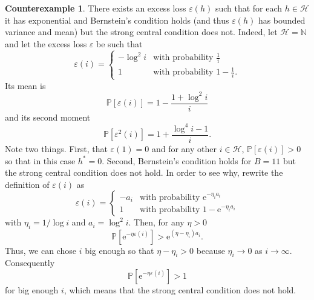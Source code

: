 \documentclass{uvamath}
\newcommand*{\nats}{\mathbb{N}}
\newcommand*{\calH}{\mathcal{H}}
\newcommand*{\bbP}{\mathbb{P}}
\newcommand*{\rme}{\mathrm{e}}
\theoremstyle{remark}
\theoremstyle{definition}
\newtheorem{counterexample}[theorem]{Counterexample}
\theoremstyle{definition}
\theoremstyle{definition}
\theoremstyle{definition}
\theoremstyle{definition}
\begin{document}
\begin{counterexample}\label{ctrex:bernstein_but_not_central}
  There exists an excess loss $\varepsilon(h)$ such that for each
  $h\in\calH$ it has exponential and Bernstein's condition holds (and
  thus $\varepsilon(h)$ has bounded variance and mean) but the strong
  central condition does not. Indeed, let $\calH = \nats$ and let the
  excess loss $\varepsilon$ be such that
  \begin{equation*}
    \varepsilon(i)  =
    \begin{cases}
      -\log^2 i &\mbox{with probability } \frac{1}{i} \\
      1 &\mbox{with probability } 1-\frac{1}{i}.
    \end{cases}
  \end{equation*}
  Its mean is
  \begin{equation*}
    \bbP[\varepsilon(i)] = 1 - \frac{1 + \log^2 i}{i}
  \end{equation*}
  and its second moment
  \begin{equation*}
    \bbP[\varepsilon^2(i)] = 1 + \frac{\log^4 i - 1}{i}.
  \end{equation*}
  Note two things. First, that $\varepsilon(1) = 0$ and for any other
  $i\in\calH$, $\bbP[\varepsilon(i)]>0$ so that in this case
  $h^* = 0$.  Second, Bernstein's condition holds for $B = 11$ but the
  strong central condition does not hold. In order to see why, rewrite
  the definition of $\varepsilon(i)$ as
  \begin{equation*}
    \varepsilon(i)  =
    \begin{cases}
      -a_i &\mbox{with probability } \rme^{-\eta_i a_i} \\
      1 &\mbox{with probability } 1-\rme^{-\eta_i a_i}
    \end{cases}
  \end{equation*}
  with $\eta_i = 1/\log i$ and $a_i = \log^2 i$. Then, for any
  $\eta>0$
  \begin{equation*}
    \bbP[\rme^{-\eta\varepsilon(i)}]> \rme^{(\eta-\eta_i)a_i}.
  \end{equation*}
  Thus, we can chose $i$ big enough so that $\eta-\eta_i > 0$ because
  $\eta_i\to 0$ as $i\to\infty$. Consequently
  \begin{equation*}
    \bbP[\rme^{-\eta \varepsilon(i)}] > 1
  \end{equation*}
  for big enough $i$, which means that the strong central condition
  does not hold.
\end{counterexample}
\end{document}
